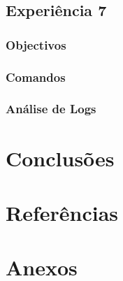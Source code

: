 \documentclass[a4paper,11pt]{article}
\begin{document}
\subsection{Experiência 7}
\subsubsection{Objectivos}

\subsubsection{Comandos}

\subsubsection{Análise de Logs}

\section{Conclusões}

\section{Referências}

\section{Anexos}

\lstset{showstringspaces=false,
		frame=tb,
		caption=WireShark Exp 1 - PC 1 }
		
\end{document}
